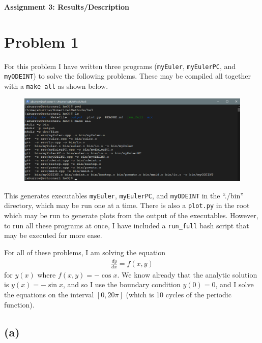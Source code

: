 \documentclass[12pt]{article}
\begin{document}
\begin{center}\begin{LARGE}
\textbf{Assignment 3: Results/Description}
\end{LARGE}\end{center}

\section*{Problem 1}

For this problem I have written three programs (\texttt{myEuler},
\texttt{myEulerPC}, and \texttt{myODEINT}) to solve the following problems.
These may be compiled all together with a \texttt{make all} as shown below.

\begin{figure}[H]
    \centering
    \includegraphics[width=1\textwidth]{compile}
    \label{fig:compile}
\end{figure}

This generates executables \texttt{myEuler}, \texttt{myEulerPC}, and
\texttt{myODEINT} in the ``./bin'' directory, which may be run one at a time.
There is also a \texttt{plot.py} in the root which may be run to generate plots
from the output of the executables. However, to run all these programs at once,
I have included a \texttt{run\_full} bash script that may be executed for more
ease.

For all of these problems, I am solving the equation
$$
\begin{aligned}
\frac{dy}{dx} = f(x, y)
\end{aligned}
$$
for $y(x)$ where $f(x, y) = -\cos x$. We know already that the analytic
solution is $y(x) = -\sin x$, and so I use the boundary condition $y(0) = 0$,
and I solve the equations on the interval $[0, 20\pi]$ (which is 10 cycles of
the periodic function).

\subsection*{(a)}
\end{document}

